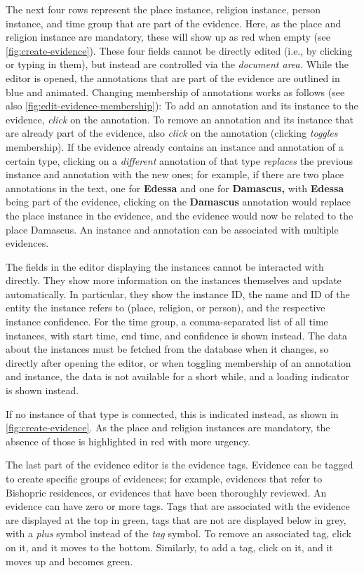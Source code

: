 The next four rows represent the place instance, religion instance, person instance, and time group that are part of the evidence.
Here, as the place and religion instance are mandatory, these will show up as red when empty (see \cref{fig:create-evidence}).
These four fields cannot be directly edited (i.e., by clicking or typing in them), but instead are controlled via the \emph{document area.}
While the editor is opened, the annotations that are part of the evidence are outlined in blue and animated.
Changing membership of annotations works as follows (see also \cref{fig:edit-evidence-membership}):
To add an annotation and its instance to the evidence, \emph{click} on the annotation.
To remove an annotation and its instance that are already part of the evidence, also \emph{click} on the annotation (clicking \emph{toggles} membership).
If the evidence already contains an instance and annotation of a certain type, clicking on a \emph{different} annotation of that type \emph{replaces} the previous instance and annotation with the new ones;
for example, if there are two place annotations in the text, one for \textbf{Edessa} and one for \textbf{Damascus,} with \textbf{Edessa} being part of the evidence, clicking on the \textbf{Damascus} annotation would replace the place instance in the evidence, and the evidence would now be related to the place Damascus.
An instance and annotation can be associated with multiple evidences.

The fields in the editor displaying the instances cannot be interacted with directly.
They show more information on the instances themselves and update automatically.
In particular, they show the instance ID, the name and ID of the entity the instance refers to (place, religion, or person), and the respective instance confidence.
For the time group, a comma-separated list of all time instances, with start time, end time, and confidence is shown instead.
The data about the instances must be fetched from the database when it changes, so directly after opening the editor, or when toggling membership of an annotation and instance, the data is not available for a short while, and a loading indicator is shown instead.

If no instance of that type is connected, this is indicated instead, as shown in \cref{fig:create-evidence}.
As the place and religion instances are mandatory, the absence of those is highlighted in red with more urgency.

The last part of the evidence editor is the evidence tags.
Evidence can be tagged to create specific groups of evidences;
for example, evidences that refer to Bishopric residences, or evidences that have been thoroughly reviewed.
An evidence can have zero or more tags.
Tags that are associated with the evidence are displayed at the top in green, tags that are not are displayed below in grey, with a \emph{plus} symbol instead of the \emph{tag} symbol.
To remove an associated tag, click on it, and it moves to the bottom.
Similarly, to add a tag, click on it, and it moves up and becomes green.

